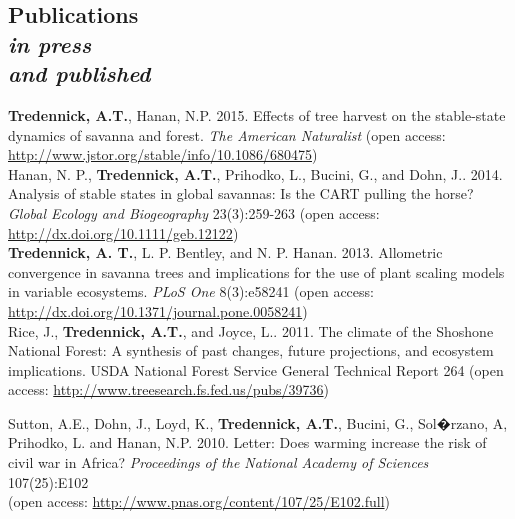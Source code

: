 \documentclass[margin,line]{resume}
\begin{document}
\begin{resume}
    \section{\mysidestyle Publications\\ \textsl{\footnotesize in press}\\ \textsl{\footnotesize and published}}     
     	\textbf{Tredennick, A.T.}, Hanan, N.P. 2015. Effects of tree harvest on the stable-state dynamics of savanna and forest. \textsl{The American Naturalist} (open access: \href{http://www.jstor.org/stable/info/10.1086/680475}{http://www.jstor.org/stable/info/10.1086/680475}) \vspace{-6mm} \\%
	
	Hanan, N. P., \textbf{Tredennick, A.T.}, Prihodko, L., Bucini, G., and Dohn, J.. 2014. Analysis of stable states in global savannas: Is the CART pulling the horse? 	\textsl{Global Ecology and Biogeography} 23(3):259-263 (open access: \href{http://dx.doi.org/10.1111/geb.12122}{http://dx.doi.org/10.1111/geb.12122}) \vspace{-6mm}\\%
	
	\textbf{Tredennick, A. T.}, L. P. Bentley, and N. P. Hanan. 2013. Allometric convergence in savanna trees and implications for the use of plant scaling models in 	variable ecosystems. \textsl{PLoS One} 8(3):e58241 (open access: \href{http://dx.doi.org/10.1371/journal.pone.0058241}{http://dx.doi.org/10.1371/journal.pone.0058241})\vspace{-6mm}\\%
	
	Rice, J., \textbf{Tredennick, A.T.}, and Joyce, L.. 2011. The climate of the Shoshone National Forest: A synthesis of past changes, future projections, and 			ecosystem implications. USDA National Forest Service General Technical Report 264 (open access: \href{http://www.treesearch.fs.fed.us/pubs/39736}{http://www.treesearch.fs.fed.us/pubs/39736}) \vspace{-6mm}\\%
	    \newpage
	
	Sutton, A.E., Dohn, J., Loyd, K., \textbf{Tredennick, A.T.}, Bucini, G., Sol�rzano, A, Prihodko, L. and Hanan, N.P. 2010. Letter: Does warming increase the risk of civil war 	in Africa? \textsl{Proceedings of the National Academy of Sciences} 107(25):E102 \\ (open access: \href{http://www.pnas.org/content/107/25/E102.full}{http://www.pnas.org/content/107/25/E102.full}) %


\end{resume}
\end{document}

